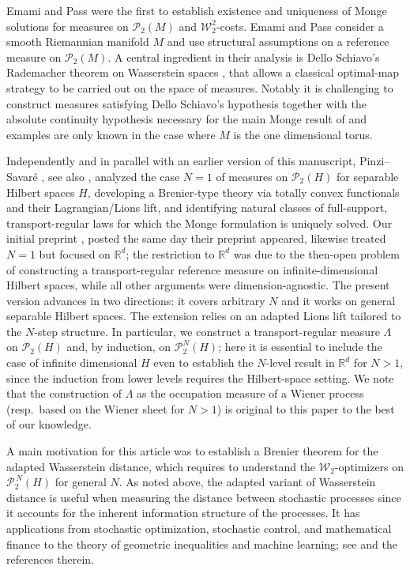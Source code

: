 \documentclass[a4paper]{amsart}
\numberwithin{theorem}{section}
\theoremstyle{definition}
\newcommand{\W}{\mathcal{W}}
\newcommand{\Pc}{\mathcal P}
\begin{document}
Emami and Pass \cite{EmPa25} were the first to establish existence and uniqueness of Monge solutions for measures on $\Pc_2(M)$ and  $\W_2^2$-costs. Emami and Pass consider a smooth Riemannian manifold $M$ and use
 structural assumptions on a reference measure on $\mathcal{P}_2(M)$. A central ingredient in their analysis is Dello Schiavo’s Rademacher theorem on Wasserstein spaces \cite{De20}, that allows a classical optimal-map strategy to be carried out on the space of measures. Notably it is challenging to construct measures satisfying Dello Schiavo's hypothesis together with the absolute continuity hypothesis necessary for the main Monge result of \cite{EmPa25} and examples are only known in the case where $M$ is the one dimensional torus.




Independently and in parallel with an earlier version of this manuscript, Pinzi--Savaré \cite{PiSa25}, see also \cite{PiSa25b,Pi25}, analyzed the case $N=1$ of measures on $\mathcal{P}_2(H)$ for separable Hilbert spaces $H$, developing a Brenier-type theory via totally convex functionals and their Lagrangian/Lions lift, and identifying natural classes of full-support, transport-regular laws for which the Monge formulation is uniquely solved. Our initial preprint \cite{BePaSc25}, posted the same day their preprint appeared, likewise treated $N=1$ but focused on $\mathbb{R}^d$; the restriction to $\mathbb{R}^d$ was  due to the then-open problem of constructing a transport-regular reference measure on infinite-dimensional Hilbert spaces, while all other arguments were dimension-agnostic. The present version advances in two directions: it covers arbitrary $N$ and it works on general separable Hilbert spaces. The extension relies on an adapted Lions lift tailored to the $N$-step structure. In particular, we construct a transport-regular measure $\Lambda$ on $\mathcal{P}_2(H)$ and, by induction, on $\mathcal{P}_2^{N}(H)$; here it is  essential to include the case of infinite dimensional $H$ even to establish the $N$-level result in $\mathbb{R}^d$ for $N>1$, since the induction from lower levels requires the Hilbert-space setting. We note that the construction of $\Lambda$ as the occupation measure of a Wiener process (resp.\ based on the Wiener sheet for $N>1$) is original to this paper to the best of our knowledge. 





A main motivation for this article was to establish a Brenier theorem for the adapted Wasserstein distance, which requires to understand the $\W_2$-optimizers on $\mathcal{P}_2^{\,N}(H)$ for general $N$. As noted above, 
 the adapted variant of Wasserstein distance is useful when measuring the distance between stochastic processes since it  accounts for the inherent information structure of the processes. It has  applications from stochastic optimization, stochastic control, and mathematical finance to the theory of geometric inequalities and machine learning; see \cite{PfPi14, La18, XuAc21, BaBePa21, AcKraPa24, CoLi24, JiOb24, BaWi23, AcKrPa25} and the references therein. 
\end{document}
